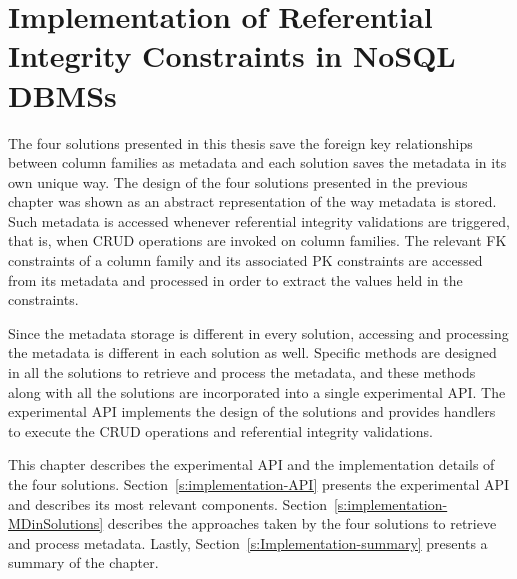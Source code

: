 \chapter{Implementation of Referential Integrity Constraints in NoSQL DBMSs}
\label{c:Implementation}

The four solutions presented in this thesis save the foreign key relationships
between column families as metadata and each solution saves the metadata in its
own unique way.  The design of the four solutions presented in the previous
chapter was shown as an  abstract representation of the way metadata is
stored.
Such metadata is accessed whenever referential integrity
validations are triggered, that is, when \ac{CRUD} operations are invoked on
column families. The relevant  \ac{FK} constraints of a column family and
its associated \ac{PK} constraints are accessed from its metadata and processed
in order to extract the values held in the constraints. 

Since the metadata storage is different in
every solution, accessing and processing the  metadata is different in each
solution as well. 
Specific methods are designed in all the solutions to retrieve and process the
metadata, and these methods along with all the
solutions are incorporated into a single experimental \ac{API}. The
experimental \ac{API} implements the design of the solutions and provides
handlers to execute the \ac{CRUD} operations and referential
integrity validations. 

This chapter describes  the experimental \ac{API} and
the implementation details of the  four solutions.
Section~\ref{s:implementation-API} presents the experimental \ac{API} and
describes its most relevant components.
Section~\ref{s:implementation-MDinSolutions} describes the approaches taken by
the four solutions to retrieve and process metadata.
Lastly, Section~\ref{s:Implementation-summary} presents a summary of the
chapter.
 

 
	

